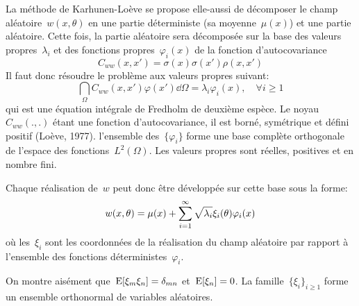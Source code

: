La méthode de Karhunen-Loève se propose elle-aussi de décomposer le champ aléatoire~$w(x,\theta)$ en une partie déterministe (sa moyenne~$\mu(x)$) et une partie aléatoire.
Cette fois, la partie aléatoire sera décomposée sur la base des valeurs propres~$\lambda_i$ et des fonctions propres~$\varphi_i(x)$ de la fonction d'autocovariance
\begin{equation}
C_{ww}(x,x')=\sigma(x)\sigma(x')\rho(x,x')
\end{equation}
Il faut donc résoudre le problème aux valeurs propres suivant:
\begin{equation}
\dint_\Omega C_{ww}(x,x')\varphi(x')\dd \Omega = \lambda_i\varphi_i(x), \quad \forall i\ge 1
\end{equation}
qui est une équation intégrale de Fredholm de deuxième espèce.
Le noyau~$C_{ww}(.,.)$ étant une fonction d'autocovariance, il est borné, symétrique et défini positif (Loève, 1977). l'ensemble des~$\{\varphi_i\}$ forme une base complète orthogonale de l'espace des fonctions~$L^2(\Omega)$. Les valeurs propres sont réelles, positives et en nombre fini. 

\medskip
Chaque réalisation de~$w$ peut donc être développée sur cette base sous la forme:
\begin{equation}\label{Eq-KL}
w(x,\theta) = \mu(x) + \displaystyle\sum_{i=1}^\infty \sqrt{\lambda_i}\xi_i(\theta)\varphi_i(x)
\end{equation}
où les~$\xi_i$ sont les coordonnées de la réalisation du champ aléatoire par rapport à l'ensemble des fonctions déterministes~$\varphi_i$.

On montre aisément que~$\operatorname{E}[\xi_m\xi_n]=\delta_{mn}$ et~$\operatorname{E}[\xi_n]=0$. La famille~$\{\xi_i\}_{i\ge1}$ forme un ensemble orthonormal de variables aléatoires.

